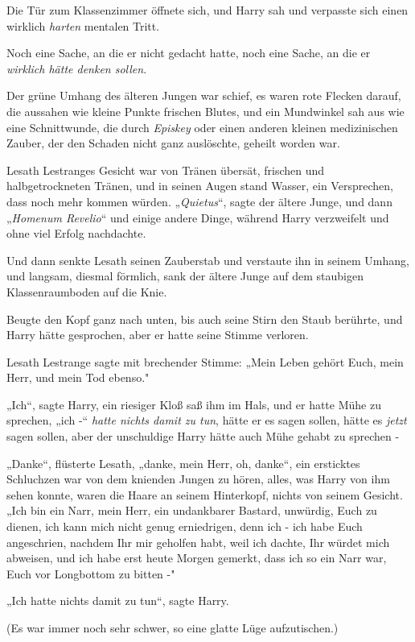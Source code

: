 {Die Tür zum Klassenzimmer öffnete sich, und Harry sah und verpasste sich einen wirklich \emph{harten} mentalen Tritt.

Noch eine Sache, an die er nicht gedacht hatte, noch eine Sache, an die er \emph{wirklich hätte denken sollen}.

Der grüne Umhang des älteren Jungen war schief, es waren rote Flecken darauf, die aussahen wie kleine Punkte frischen Blutes, und ein Mundwinkel sah aus wie eine Schnittwunde, die durch \emph{Episkey} oder einen anderen kleinen medizinischen Zauber, der den Schaden nicht ganz auslöschte, geheilt worden war.

Lesath Lestranges Gesicht war von Tränen übersät, frischen und halbgetrockneten Tränen, und in seinen Augen stand Wasser, ein Versprechen, dass noch mehr kommen würden. „\emph{Quietus}“, sagte der ältere Junge, und dann „\emph{Homenum Revelio}“ und einige andere Dinge, während Harry verzweifelt und ohne viel Erfolg nachdachte.

Und dann senkte Lesath seinen Zauberstab und verstaute ihn in seinem Umhang, und langsam, diesmal förmlich, sank der ältere Junge auf dem staubigen Klassenraumboden auf die Knie.

Beugte den Kopf ganz nach unten, bis auch seine Stirn den Staub berührte, und Harry hätte gesprochen, aber er hatte seine Stimme verloren.

Lesath Lestrange sagte mit brechender Stimme: „Mein Leben gehört Euch, mein Herr, und mein Tod ebenso."

„Ich“, sagte Harry, ein riesiger Kloß saß ihm im Hals, und er hatte Mühe zu sprechen, „ich -“ \emph{hatte nichts damit zu tun}, hätte er es sagen sollen, hätte es \emph{jetzt} sagen sollen, aber der unschuldige Harry hätte auch Mühe gehabt zu sprechen -

„Danke“, flüsterte Lesath, „danke, mein Herr, oh, danke“, ein ersticktes Schluchzen war von dem knienden Jungen zu hören, alles, was Harry von ihm sehen konnte, waren die Haare an seinem Hinterkopf, nichts von seinem Gesicht. „Ich bin ein Narr, mein Herr, ein undankbarer Bastard, unwürdig, Euch zu dienen, ich kann mich nicht genug erniedrigen, denn ich - ich habe Euch angeschrien, nachdem Ihr mir geholfen habt, weil ich dachte, Ihr würdet mich abweisen, und ich habe erst heute Morgen gemerkt, dass ich so ein Narr war, Euch vor Longbottom zu bitten -"

„Ich hatte nichts damit zu tun“, sagte Harry.

(Es war immer noch sehr schwer, so eine glatte Lüge aufzutischen.)

}
